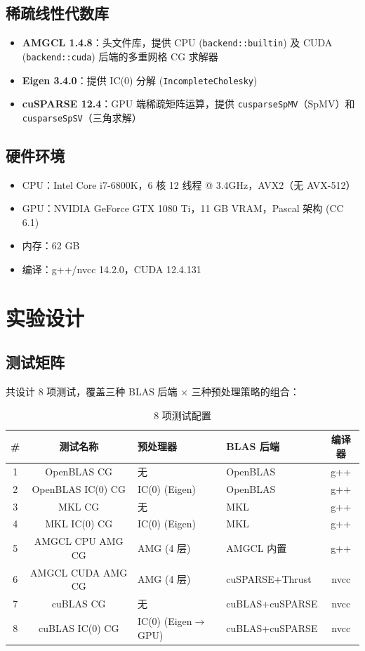 \documentclass[12pt,a4paper]{ctexart}
\begin{document}
\subsection{稀疏线性代数库}

\begin{itemize}
\item \textbf{AMGCL 1.4.8}：头文件库，提供 CPU (\texttt{backend::builtin}) 及 CUDA (\texttt{backend::cuda}) 后端的多重网格 CG 求解器
\item \textbf{Eigen 3.4.0}：提供 IC(0) 分解 (\texttt{IncompleteCholesky})
\item \textbf{cuSPARSE 12.4}：GPU 端稀疏矩阵运算，提供 \texttt{cusparseSpMV}（SpMV）和 \texttt{cusparseSpSV}（三角求解）
\end{itemize}

\subsection{硬件环境}

\begin{itemize}
\item CPU：Intel Core i7-6800K，6 核 12 线程 @ 3.4GHz，AVX2（无 AVX-512）
\item GPU：NVIDIA GeForce GTX 1080 Ti，11 GB VRAM，Pascal 架构 (CC 6.1)
\item 内存：62 GB
\item 编译：g++/nvcc 14.2.0，CUDA 12.4.131
\end{itemize}

\section{实验设计}

\subsection{测试矩阵}

共设计 8 项测试，覆盖三种 BLAS 后端 × 三种预处理策略的组合：

\begin{table}[htbp]
\centering
\caption{8 项测试配置}
\label{tab:design}
\begin{tabular}{ccllc}
\toprule
\# & 测试名称 & 预处理器 & BLAS 后端 & 编译器 \\
\midrule
1 & OpenBLAS CG & 无 & OpenBLAS & g++ \\
2 & OpenBLAS IC(0) CG & IC(0) (Eigen) & OpenBLAS & g++ \\
3 & MKL CG & 无 & MKL & g++ \\
4 & MKL IC(0) CG & IC(0) (Eigen) & MKL & g++ \\
5 & AMGCL CPU AMG CG & AMG (4 层) & AMGCL 内置 & g++ \\
6 & AMGCL CUDA AMG CG & AMG (4 层) & cuSPARSE+Thrust & nvcc \\
7 & cuBLAS CG & 无 & cuBLAS+cuSPARSE & nvcc \\
8 & cuBLAS IC(0) CG & IC(0) (Eigen$\to$GPU) & cuBLAS+cuSPARSE & nvcc \\
\bottomrule
\end{tabular}
\end{table}
\end{document}

